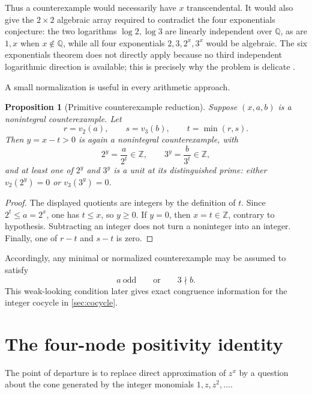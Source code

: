 \documentclass[11pt]{article}
\newtheorem{proposition}[theorem]{Proposition}
\theoremstyle{definition}
\newcommand{\Z}{\mathbb Z}
\newcommand{\Q}{\mathbb Q}
\begin{document}
Thus a counterexample would necessarily have $x$ transcendental.  It would also give the $2\times2$ algebraic array required to contradict the four exponentials conjecture: the two logarithms $\log2,\log3$ are linearly independent over $\Q$, as are $1,x$ when $x\notin\Q$, while all four exponentials $2,3,2^x,3^x$ would be algebraic.  The six exponentials theorem does not directly apply because no third independent logarithmic direction is available; this is precisely why the problem is delicate \cite{Waldschmidt2000,Lang1966}.

A small normalization is useful in every arithmetic approach.

\begin{proposition}[Primitive counterexample reduction]\label{prop:primitive}
Suppose $(x,a,b)$ is a nonintegral counterexample.  Let
\[
 r=v_2(a),\qquad s=v_3(b),\qquad t=\min(r,s).
\]
Then $y=x-t>0$ is again a nonintegral counterexample, with
\[
 2^y=\frac{a}{2^t}\in\Z,\qquad 3^y=\frac{b}{3^t}\in\Z,
\]
and at least one of $2^y$ and $3^y$ is a unit at its distinguished prime: either $v_2(2^y)=0$ or $v_3(3^y)=0$.
\end{proposition}
\begin{proof}
The displayed quotients are integers by the definition of $t$.  Since $2^t\le a=2^x$, one has $t\le x$, so $y\ge0$.  If $y=0$, then $x=t\in\Z$, contrary to hypothesis.  Subtracting an integer does not turn a noninteger into an integer.  Finally, one of $r-t$ and $s-t$ is zero.
\end{proof}

Accordingly, any minimal or normalized counterexample may be assumed to satisfy
\begin{equation}\label{eq:primitive-condition}
 a\ \text{odd}\qquad\text{or}\qquad 3\nmid b.
\end{equation}
This weak-looking condition later gives exact congruence information for the integer cocycle in \cref{sec:cocycle}.

\section{The four-node positivity identity}\label{sec:positivity}

The point of departure is to replace direct approximation of $z^x$ by a question about the cone generated by the integer monomials $1,z,z^2,\dots$.
\end{document}
